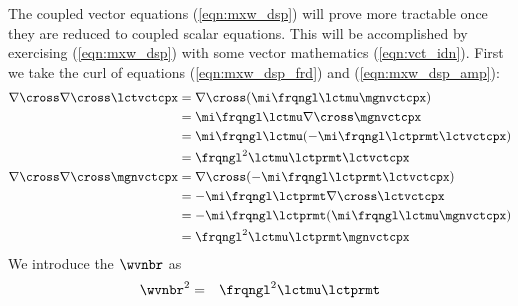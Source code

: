 \documentclass[12pt]{article}
\begin{document}
The coupled vector equations (\ref{eqn:mxw_dsp}) will prove more
tractable once they are reduced to coupled scalar equations.
This will be accomplished by exercising (\ref{eqn:mxw_dsp}) with 
some vector mathematics (\ref{eqn:vct_idn}). 
First we take the curl of equations (\ref{eqn:mxw_dsp_frd}) and
(\ref{eqn:mxw_dsp_amp}):
\begin{subequations}
\label{eqn:mxw_dsp_crl}
\begin{align}
\label{eqn:mxw_dsp_frd_crl}
\nabla \cross \nabla \cross \lctvctcpx 
& = \nabla \cross (\mi \frqngl \lctmu \mgnvctcpx) \nonumber \\
& = \mi \frqngl \lctmu \nabla \cross \mgnvctcpx \nonumber \\
& = \mi \frqngl \lctmu (- \mi \frqngl \lctprmt \lctvctcpx) \nonumber \\
& = \frqngl^{2} \lctmu \lctprmt \lctvctcpx \\
\label{eqn:mxw_dsp_amp_crl}
\nabla \cross \nabla \cross \mgnvctcpx 
& = \nabla \cross (- \mi \frqngl \lctprmt \lctvctcpx) \nonumber \\
& = - \mi \frqngl \lctprmt \nabla \cross \lctvctcpx \nonumber \\
& = - \mi \frqngl \lctprmt (\mi \frqngl \lctmu \mgnvctcpx) \nonumber \\
& = \frqngl^{2} \lctmu \lctprmt \mgnvctcpx
\end{align}
\end{subequations} 
We introduce the  $\wvnbr$ as
\begin{eqnarray}
\wvnbr^{2} & = & \frqngl^{2} \lctmu \lctprmt
\label{eqn:wvnbr_dsp_dfn}
\end{eqnarray}
\end{document}

